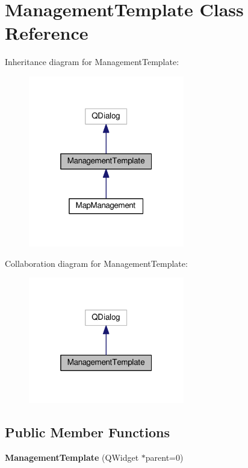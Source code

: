 \hypertarget{class_management_template}{}\section{Management\+Template Class Reference}
\label{class_management_template}


Inheritance diagram for Management\+Template\+:
\nopagebreak
\begin{figure}[H]
\begin{center}
\leavevmode
\includegraphics[width=193pt]{class_management_template__inherit__graph}
\end{center}
\end{figure}


Collaboration diagram for Management\+Template\+:
\nopagebreak
\begin{figure}[H]
\begin{center}
\leavevmode
\includegraphics[width=193pt]{class_management_template__coll__graph}
\end{center}
\end{figure}
\subsection*{Public Member Functions}
\begin{DoxyCompactItemize}
\item 
{\bfseries Management\+Template} (Q\+Widget $\ast$parent=0)\hypertarget{class_management_template_ad31491b5f974a7284e5b8f8c8251291a}{}\label{class_management_template_ad31491b5f974a7284e5b8f8c8251291a}

\end{DoxyCompactItemize}
